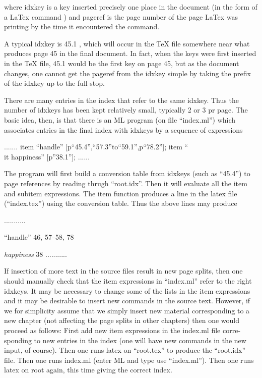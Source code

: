 where idxkey is a key inserted precisely one place in the document 
(in the form of a LaTex command )
and pageref is the page number of the page LaTex was printing
by the time it encountered the  command.

A typical idxkey is 45.1 , which will occur in the TeX file 
somewhere near what produces page 45 in the final document. 
In fact, when the keys were first inserted in the TeX file, 
45.1 would be the first key on page 45, but as the document changes, 
one cannot get the pageref from the idxkey simple by taking the 
prefix of the idxkey up to the full stop.

There are many entries in the index that refer to the same
idxkey. Thus the number of idxkeys has been kept relatively
small, typically 2 or 3 pr page. The basic idea, then, is that
there is an ML program (on file ``index.ml'') which
associates entries in the final index with idxkeys by 
a sequence of expressions

              .......
              item ``handle'' [p``45.4'',``57.3''to``59.1'',p``78.2''];
              item ``{\\it happiness}'' [p''38.1''];
              ......
 
The program will first build a conversion table from idxkeys
(such as ``45.4'') to page references by reading thrugh
``root.idx''. Then it will evaluate all the item and subitem
expressions. The item function produces a line in the
latex file (``index.tex'') using the conversion table.
Thus the above lines may produce

               ...........
               \item ``handle'' 46, 57--58, 78
               \item {\it happiness} 38
               ...........

If insertion of more text in the source files result in 
new page splits, then one should manually check that
the item expressions in ``index.ml'' refer to the
right idxkeys. It may be necessary to change some of the
lists in the item expressions and it may be desirable to
insert new \index commands in the source text. However,
if we for simplicity assume that we simply insert new
material corresponding to a new chapter (not affecting
the page splits in other chapters) then one would proceed
as follows:
First add new item expressions in the index.ml file corre-
sponding to new entries in the index (one will have new
\index commands in the new input, of course). Then one
runs latex on ``root.tex'' to produce the ``root.idx'' file. 
Then one runs index.ml (enter ML and type use ``index.ml'').
Then one runs latex on root again, this time giving the 
correct index.






